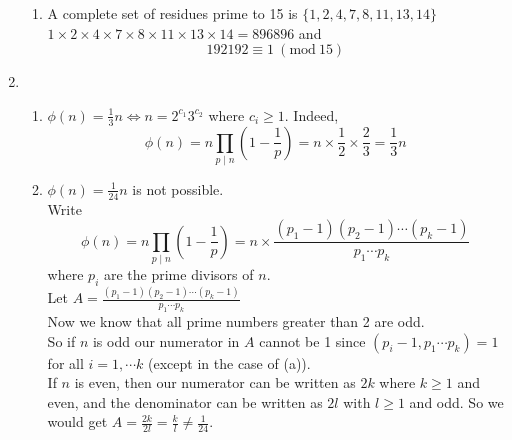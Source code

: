 \documentclass[11pt]{article}
\newcommand{\Mod}[1]{\ (\mathrm{mod}\ #1)}
\begin{document}
\begin{enumerate}
{\begin{enumerate}
{\begin{enumerate}
\item  Let $R = \lbrace r_1, r_2, \cdots , r_{\phi(p^c)}\rbrace$ be a complete set of residues prime to $p_c$.
Then for each $r_i$ there exists a unique $r_j$ such that $r_jr_i \equiv 1 \Mod{p^c}$ since $(r_i, p^c) =1$.
\item Now for $x\in R$, $x^2 \equiv 1 \Mod{p^c} \Leftrightarrow p^c \mid (x+1)(x-1) \Leftrightarrow x = 1 \mbox{ or } p^c-1 \Leftrightarrow x\equiv \pm 1 \Mod{p^c}$. 
\item So now we consider $K = r_1r_2\cdots r_{\phi(p^c)}$, where $r_1 = 1$ and  $r_{\phi(p^c)} = p^c-1$. It is easy to see that $K' =r_2\cdots r_{\phi(p^c)-1} \equiv 1\Mod{p^c}$ since $K'$ has an even number of terms ($\phi(p^c) =p^c-p^{c-1}$ which is even) and by (ii). Therefore $K \equiv r_{\phi(p^c)} \Mod{p^c} \equiv -1 \Mod{p^c}$.
\end{enumerate}}
\item A complete set of residues prime to 15 is $\lbrace 1, 2, 4, 7, 8, 11, 13, 14\rbrace$\\
$1 \times 2 \times 4\times 7 \times 8\times 11 \times 13 \times 14 = 896896$
and $$192192 \equiv 1 \Mod{15}$$
\end{enumerate}}
\item{\begin{enumerate}
\item $\phi(n) = \frac{1}{3}n \Leftrightarrow n = 2^{c_1}3^{c_2}$ where $c_i \geq 1$.
Indeed, $$\phi(n) = n \prod_{p \mid n} (1-\frac{1}{p}) = n \times \frac{1}{2} \times \frac{2}{3} = \frac{1}{3}n$$
\item $\phi(n) = \frac{1}{24} n $ is not possible. 
\\ Write $$\phi(n) = n \prod_{p \mid n} (1-\frac{1}{p}) =n \times \frac{(p_1 -1)(p_2-1) \cdots (p_k-1)}{p_1\cdots p_k}$$
where $p_i$ are the prime divisors of $n$.\\
Let $ A = \frac{(p_1 -1)(p_2-1) \cdots (p_k-1)}{p_1\cdots p_k}$\\
Now we know that all prime numbers greater than 2 are odd. \\So if $n$ is odd our numerator in $A$ cannot be 1 since $(p_i-1, p_1\cdots p_k) = 1$ for all $i= 1, \cdots k$ (except in the case of (a)). \\If $n$ is even, then our numerator can be written as $2k$ where $k\geq 1 $ and even, and the denominator can be written as $2l$ with $l\geq 1$ and odd. So we would get $A = \frac{2k}{2l} = \frac{k}{l} \not = \frac{1}{24}$.
 

\end{enumerate}}
\end{enumerate}
\end{document}
